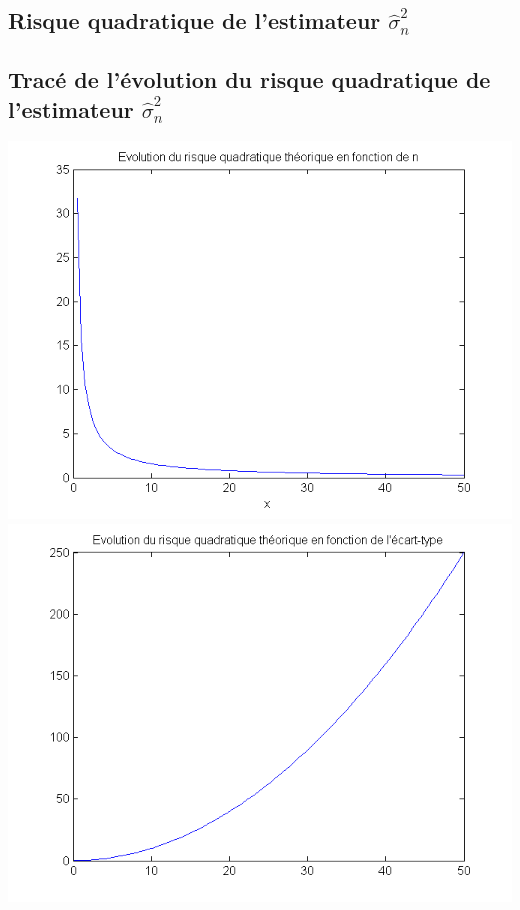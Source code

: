 \documentclass{report}
\begin{document}
		\subsection{Risque quadratique de l'estimateur $\hat\sigma^2_n$}
		\subsection{Tracé de l'évolution du risque quadratique de l'estimateur $\hat\sigma^2_n$}
			\begin{center}
				\includegraphics[scale=0.7]{sources/Q314-1.png}
				\includegraphics[scale=0.7]{sources/Q314-2.png}

\end{center}
\end{document}
